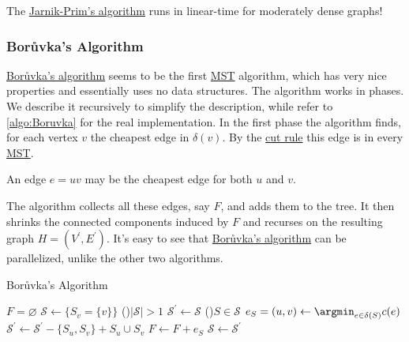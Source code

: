 \begin{remark}
	The \hyperref[algo:Jarnik-Prim]{Jarnik-Prim's algorithm} runs in linear-time for moderately dense graphs!
\end{remark}

\subsubsection{Borůvka's Algorithm}
\hyperref[algo:Boruvka]{Borůvka's algorithm} seems to be the first \hyperref[prb:MST]{MST} algorithm, which has very nice properties and essentially uses no data structures. The algorithm works in phases. We describe it recursively to simplify the description, while refer to \autoref{algo:Boruvka} for the real implementation. In the first phase the algorithm finds, for each vertex \(v\) the cheapest edge in \(\delta (v)\). By the \hyperref[lma:cut-rule]{cut rule} this edge is in every \hyperref[prb:MST]{MST}.

\begin{note}
	An edge \(e = uv\) may be the cheapest edge for both \(u\) and \(v\).
\end{note}

The algorithm collects all these edges, say \(F\), and adds them to the tree. It then shrinks the connected components induced by \(F\) and recurses on the resulting graph \(H = (V^{\prime}  , E^{\prime} )\). It's easy to see that \hyperref[algo:Boruvka]{Borůvka's algorithm} can be parallelized, unlike the other two algorithms.

\begin{algorithm}[H]\label{algo:Boruvka}
	\DontPrintSemicolon{}
	\caption{Borůvka's Algorithm}
	\BlankLine

	\(F = \varnothing \)
	\(\mathcal{S} \gets \{ S_v = \{ v \} \} \)
	\While(){\(\lvert \mathcal{S} \rvert > 1\)}{
		\(\mathcal{S} ^{\prime} \gets \mathcal{S} \)
		\For(){\(S \in \mathcal{S} \)}{
			\(e_S = (u, v) \gets \argmin_{e \in \delta (S)} c(e)\)\;
			\(\mathcal{S}^{\prime} \gets \mathcal{S}^{\prime} - \{ S_u, S_v \} + S_u \cup S_v\)\label{algo:Boruvka-notation}
			\(F \gets F + e_S\)
		}
		\(\mathcal{S} \gets \mathcal{S} ^{\prime} \)
	}
	\;
\end{algorithm}

